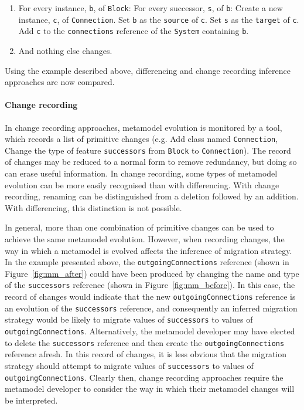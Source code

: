 \begin{enumerate}
	\item For every instance, \texttt{b}, of \texttt{Block}:
		\subitem For every successor, \texttt{s}, of \texttt{b}:
			\subsubitem Create a new instance, \texttt{c}, of \texttt{Connection}.
			\subsubitem Set \texttt{b} as the \texttt{source} of \texttt{c}.
			\subsubitem Set \texttt{s} as the \texttt{target} of \texttt{c}.
			\subsubitem Add \texttt{c} to the \texttt{connections} reference of the \texttt{System} containing \texttt{b}.
	\item And nothing else changes.
\end{enumerate}

Using the example described above, differencing and change recording inference approaches are now compared. 

\paragraph{Change recording}
In change recording approaches, metamodel evolution is monitored by a tool, which records a list of primitive changes (e.g. Add class named \texttt{Connection}, Change the type of feature \texttt{successors} from \texttt{Block} to \texttt{Connection}). The record of changes may be reduced to a normal form to remove redundancy, but doing so can erase useful information. In change recording, some types of metamodel evolution can be more easily recognised than with differencing. With change recording, renaming can be distinguished from a deletion followed by an addition. With differencing, this distinction is not possible.

In general, more than one combination of primitive changes can be used to achieve the same metamodel evolution. However, when recording changes, the way in which a metamodel is evolved affects the inference of migration strategy. In the example presented above, the \texttt{outgoingConnections} reference (shown in Figure~\ref{fig:mm_after}) could have been produced by changing the name and type of the \texttt{successors} reference (shown in Figure~\ref{fig:mm_before}). In this case, the record of changes would indicate that the new \texttt{outgoingConnections} reference is an evolution of the \texttt{successors} reference, and consequently an inferred migration strategy would be likely to migrate values of \texttt{successors} to values of \texttt{out\-go\-ingCon\-nect\-ions}. Alternatively, the metamodel developer may have elected to delete the \texttt{successors} reference and then create the \texttt{out\-go\-ingCon\-nect\-ions} reference afresh. In this record of changes, it is less obvious that the migration strategy should attempt to migrate values of \texttt{successors} to values of \texttt{out\-go\-ingCon\-nect\-ions}. Clearly then, change recording approaches require the metamodel developer to consider the way in which their metamodel changes will be interpreted.


